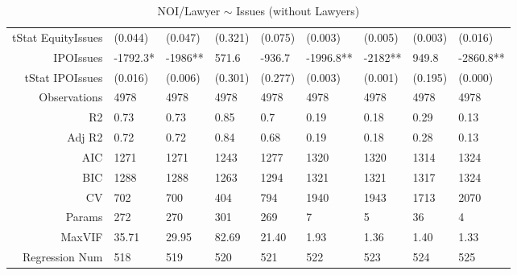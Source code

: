 \begin{table}[ht]
\begin{tabular}{rllllllll}
  tStat EquityIssues & (0.044) & (0.047) & (0.321) & (0.075) & (0.003) & (0.005) & (0.003) & (0.016) \\ 
  IPOIssues & -1792.3* & -1986** & 571.6 & -936.7 & -1996.8** & -2182** & 949.8 & -2860.8** \\ 
  tStat IPOIssues & (0.016) & (0.006) & (0.301) & (0.277) & (0.003) & (0.001) & (0.195) & (0.000) \\ 
  Observations & 4978 & 4978 & 4978 & 4978 & 4978 & 4978 & 4978 & 4978 \\ 
  R2 & 0.73 & 0.73 & 0.85 & 0.7 & 0.19 & 0.18 & 0.29 & 0.13 \\ 
  Adj R2 & 0.72 & 0.72 & 0.84 & 0.68 & 0.19 & 0.18 & 0.28 & 0.13 \\ 
  AIC & 1271 & 1271 & 1243 & 1277 & 1320 & 1320 & 1314 & 1324 \\ 
  BIC & 1288 & 1288 & 1263 & 1294 & 1321 & 1321 & 1317 & 1324 \\ 
  CV & 702 & 700 & 404 & 794 & 1940 & 1943 & 1713 & 2070 \\ 
  Params & 272 & 270 & 301 & 269 & 7 & 5 & 36 & 4 \\ 
  MaxVIF & 35.71 & 29.95 & 82.69 & 21.40 & 1.93 & 1.36 & 1.40 & 1.33 \\ 
  Regression Num & 518 & 519 & 520 & 521 & 522 & 523 & 524 & 525 \\ 
   \hline
\end{tabular}
\caption{NOI/Lawyer $\sim$ Issues (without Lawyers)} 
\end{table}
